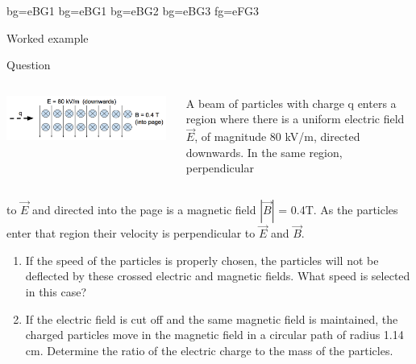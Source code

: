 {
 {bg=eBG1}
 {bg=eBG1}
 {bg=eBG2}
 {bg=eBG3}
 {fg=eFG3}

%
%
%

\begin{frame}{Worked example}

\begin{blockexmplque}{Question}

\begin{columns}
  \begin{column}{0.38\textwidth}
    \begin{center}
      \includegraphics[width=0.98\textwidth]{./images/problems/lect4_crossed_E_B_fields.png}\\
    \end{center}
  \end{column}
  \begin{column}{0.62\textwidth}
A beam of particles with charge q enters
a region where there is a uniform electric field $\vec{E}$, of
magnitude 80 kV/m, directed downwards.
In the same region, perpendicular
  \end{column}
\end{columns}
to  $\vec{E}$ and directed into the page is a magnetic
field  $|\vec{B}|$ = 0.4T.
As the particles enter that region their
velocity is perpendicular to $\vec{E}$ and $\vec{B}$.\\
\begin{enumerate}
\item
 If the speed of the particles is properly chosen, the particles will
not be deflected by these crossed electric and magnetic fields.
What speed is selected in this case?
\item
If the electric field is cut off and the same magnetic field is maintained, the charged
particles move in the magnetic field in a circular path of radius 1.14 cm. Determine the
ratio of the electric charge to the mass of the particles.
\end{enumerate}
\end{blockexmplque}
\vspace{0.4cm}


\end{frame}}
